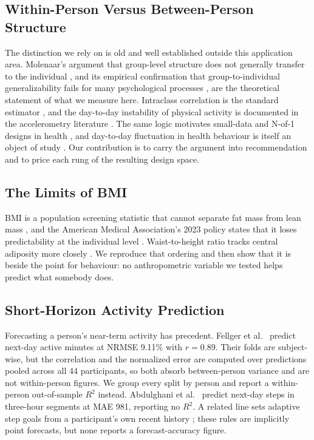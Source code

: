 \documentclass[conference]{IEEEtran}
\begin{document}
\subsection{Within-Person Versus Between-Person Structure}
The distinction we rely on is old and well established outside this application area. Molenaar's argument that group-level structure does not generally transfer to the individual \cite{molenaar2004}, and its empirical confirmation that group-to-individual generalizability fails for many psychological processes \cite{fisher2018pnas}, are the theoretical statement of what we measure here. Intraclass correlation is the standard estimator \cite{shrout1979icc, koo2016icc}, and the day-to-day instability of physical activity is documented in the accelerometry literature \cite{trost2005accel, tudorlocke2005days}. The same logic motivates small-data and N-of-1 designs in health \cite{hekler2019smalldata, lillie2011nof1}, and day-to-day fluctuation in health behaviour is itself an object of study \cite{chevance2021fluctuations}. Our contribution is to carry the argument into recommendation and to price each rung of the resulting design space.

\subsection{The Limits of BMI}
BMI is a population screening statistic that cannot separate fat mass from lean mass \cite{prentice2001bmi, rothman2008bmi, nevill2006bmi}, and the American Medical Association's 2023 policy states that it loses predictability at the individual level \cite{ama2023bmi}. Waist-to-height ratio tracks central adiposity more closely \cite{browning2010whtr, ashwell2016whtr}. We reproduce that ordering and then show that it is beside the point for behaviour: no anthropometric variable we tested helps predict what somebody does.

\subsection{Short-Horizon Activity Prediction}
Forecasting a person's near-term activity has precedent. Fellger et al.\ \cite{fellger2020nextday} predict next-day active minutes at NRMSE 9.11\% with $r = 0.89$. Their folds are subject-wise, but the correlation and the normalized error are computed over predictions pooled across all 44 participants, so both absorb between-person variance and are not within-person figures. We group every split by person \cite{saeb2017usecase} and report a within-person out-of-sample $R^2$ instead. Abdulghani et al.\ \cite{abdulghani2026phenotype} predict next-day steps in three-hour segments at MAE 981, reporting no $R^2$. A related line sets adaptive step goals from a participant's own recent history \cite{adams2013adaptive, korinek2018stepgoals, poirier2016walking, zhou2018stepgoals, adams2022reinforcement}; these rules are implicitly point forecasts, but none reports a forecast-accuracy figure.
\end{document}
